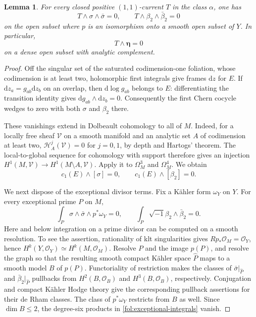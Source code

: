 \documentclass[11pt,letterpaper]{article}
\newcommand{\OO}{\mathcal{O}}
\newcommand{\dd}{\mathrm{d}}
\newcommand{\ii}{\sqrt{-1}}
\newtheorem{lemma}[theorem]{Lemma}
\theoremstyle{definition}
\theoremstyle{remark}
\begin{document}
\begin{lemma}\label{fol:annihilation}
For every closed positive $(1,1)$-current $T$ in the class $\alpha$, one has
\begin{equation}\label{fol:annihilations}
 T\wedge\sigma\wedge\bar\sigma=0,\qquad
 T\wedge\beta_2\wedge\bar\beta_2=0
\end{equation}
on the open subset where $p$ is an isomorphism onto a smooth open subset
of $Y$.  In particular,
\begin{equation}\label{fol:T-eta}
 T\wedge\boldsymbol\eta=0
\end{equation}
on a dense open subset with analytic complement.
\end{lemma}

\begin{proof}
Off the singular set of the saturated codimension-one foliation, whose
codimension is at least two, holomorphic first integrals give frames
$\dd z$ for $E$.  If $\dd z_a=g_{ab}\dd z_b$ on an overlap, then
$\dd\log g_{ab}$ belongs to $E$: differentiating the transition identity
gives $\dd g_{ab}\wedge\dd z_b=0$.  Consequently the first Chern cocycle
wedges to zero with both $\sigma$ and $\beta_2$ there.

These vanishings extend in Dolbeault cohomology to all of $M$.  Indeed,
for a locally free sheaf $\mathcal V$ on a smooth manifold and an analytic
set $A$ of codimension at least two,
$\mathcal H^j_A(\mathcal V)=0$ for $j=0,1$, by depth and Hartogs'
theorem.  The local-to-global sequence for cohomology with support
therefore gives an injection
$H^1(M,\mathcal V)\to H^1(M\setminus A,\mathcal V)$.
Apply it to $\Omega_M^3$ and $\Omega_M^4$.  We obtain
\begin{equation}\label{fol:Bott-Chern}
 c_1(E)\wedge[\sigma]=0,\qquad
 c_1(E)\wedge[\beta_2]=0.
\end{equation}

We next dispose of the exceptional divisor terms.  Fix a K\"ahler form
$\omega_Y$ on $Y$.  For every exceptional prime $P$ on $M$,
\begin{equation}\label{fol:exceptional-integrals}
 \int_P \sigma\wedge\bar\sigma\wedge p^*\omega_Y=0,\qquad
 \int_P \ii\beta_2\wedge\bar\beta_2=0.
\end{equation}
Here and below integration on a prime divisor can be computed on a
smooth resolution.  To see the assertion, rationality of klt
singularities gives $Rp_*\OO_M=\OO_Y$, hence
$H^k(Y,\OO_Y)\simeq H^k(M,\OO_M)$.  Resolve $P$ and the image $p(P)$,
and resolve the graph so that the resulting smooth compact K\"ahler
space $\widehat P$ maps to a smooth model $B$ of $p(P)$.  Functoriality
of restriction makes the classes of $\bar\sigma|_{\widehat P}$ and
$\bar\beta_2|_{\widehat P}$ pullbacks from $H^2(B,\OO_B)$ and
$H^3(B,\OO_B)$, respectively.  Conjugation and compact K\"ahler Hodge
theory give the corresponding pullback assertions for their de Rham
classes.  The class of $p^*\omega_Y$ restricts from $B$ as well.
Since $\dim B\leq2$, the degree-six products in
\eqref{fol:exceptional-integrals} vanish.


\end{proof}
\end{document}
